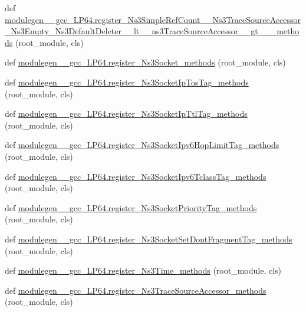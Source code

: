 \begin{DoxyCompactItemize}
\item 
def \hyperlink{namespacemodulegen____gcc__LP64_a2971d479713881f4a0fb7f82a5a0c162}{modulegen\+\_\+\+\_\+gcc\+\_\+\+L\+P64.\+register\+\_\+\+Ns3\+Simple\+Ref\+Count\+\_\+\+\_\+\+Ns3\+Trace\+Source\+Accessor\+\_\+\+Ns3\+Empty\+\_\+\+Ns3\+Default\+Deleter\+\_\+\+\_\+lt\+\_\+\+\_\+ns3\+Trace\+Source\+Accessor\+\_\+\+\_\+gt\+\_\+\+\_\+\+\_\+methods} (root\+\_\+module, cls)
\item 
def \hyperlink{namespacemodulegen____gcc__LP64_af6b6e0865bdae0eff7bd232f1211b164}{modulegen\+\_\+\+\_\+gcc\+\_\+\+L\+P64.\+register\+\_\+\+Ns3\+Socket\+\_\+methods} (root\+\_\+module, cls)
\item 
def \hyperlink{namespacemodulegen____gcc__LP64_aaf00950c86db7a44df91ae8d6fb5d5ef}{modulegen\+\_\+\+\_\+gcc\+\_\+\+L\+P64.\+register\+\_\+\+Ns3\+Socket\+Ip\+Tos\+Tag\+\_\+methods} (root\+\_\+module, cls)
\item 
def \hyperlink{namespacemodulegen____gcc__LP64_a8cc4c80820dd429c465f501e2a45fe20}{modulegen\+\_\+\+\_\+gcc\+\_\+\+L\+P64.\+register\+\_\+\+Ns3\+Socket\+Ip\+Ttl\+Tag\+\_\+methods} (root\+\_\+module, cls)
\item 
def \hyperlink{namespacemodulegen____gcc__LP64_a0610606c87081cec911e5c92c72969c2}{modulegen\+\_\+\+\_\+gcc\+\_\+\+L\+P64.\+register\+\_\+\+Ns3\+Socket\+Ipv6\+Hop\+Limit\+Tag\+\_\+methods} (root\+\_\+module, cls)
\item 
def \hyperlink{namespacemodulegen____gcc__LP64_a9183939b87f05c0cc4de3320a3fbb56b}{modulegen\+\_\+\+\_\+gcc\+\_\+\+L\+P64.\+register\+\_\+\+Ns3\+Socket\+Ipv6\+Tclass\+Tag\+\_\+methods} (root\+\_\+module, cls)
\item 
def \hyperlink{namespacemodulegen____gcc__LP64_a1e1a196158ec884ace33d88f68d667b0}{modulegen\+\_\+\+\_\+gcc\+\_\+\+L\+P64.\+register\+\_\+\+Ns3\+Socket\+Priority\+Tag\+\_\+methods} (root\+\_\+module, cls)
\item 
def \hyperlink{namespacemodulegen____gcc__LP64_a9e7921708babb536bc0caaf352c51c29}{modulegen\+\_\+\+\_\+gcc\+\_\+\+L\+P64.\+register\+\_\+\+Ns3\+Socket\+Set\+Dont\+Fragment\+Tag\+\_\+methods} (root\+\_\+module, cls)
\item 
def \hyperlink{namespacemodulegen____gcc__LP64_ade0bc7fc2ce1f975c0f8f367acfc957c}{modulegen\+\_\+\+\_\+gcc\+\_\+\+L\+P64.\+register\+\_\+\+Ns3\+Time\+\_\+methods} (root\+\_\+module, cls)
\item 
def \hyperlink{namespacemodulegen____gcc__LP64_abd8204bf10f1a73956889b2b56b0c2d3}{modulegen\+\_\+\+\_\+gcc\+\_\+\+L\+P64.\+register\+\_\+\+Ns3\+Trace\+Source\+Accessor\+\_\+methods} (root\+\_\+module, cls)

\end{DoxyCompactItemize}
